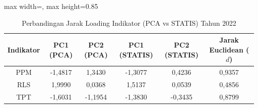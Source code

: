 \begin{table}[H]
\centering
\caption{Perbandingan Jarak Loading Indikator (PCA vs STATIS) Tahun 2022} \label{tab:sample1jarak_loading_2022}
\begin{adjustbox}{max width=\textwidth, max height=0.85\textheight}
\begin{tabular}{|c|c|c|c|c|c|}
\hline
\textbf{Indikator} & \textbf{PC1 (PCA)} & \textbf{PC2 (PCA)} & \textbf{PC1 (STATIS)} & \textbf{PC2 (STATIS)} & \textbf{Jarak Euclidean ($d$)} \\
\hline
PPM & -1,4817 & 1,3430 & -1,3077 & 0,4236 & 0,9357 \\
RLS & 1,9990 & 0,0368 & 1,5137 & 0,0539 & 0,4856 \\
TPT & -1,6031 & -1,1954 & -1,3830 & -0,3435 & 0,8799 \\
\hline
\end{tabular}
\end{adjustbox}
\end{table}